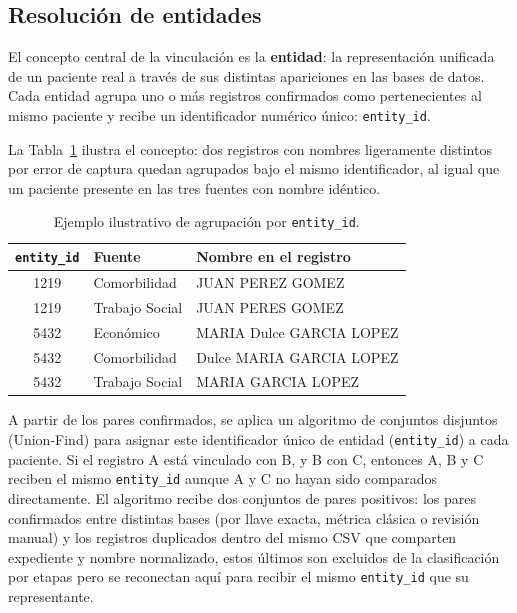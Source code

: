 \subsection{Resolución de entidades}

El concepto central de la vinculación es la \textbf{entidad}: la representación unificada de un paciente real a través de sus distintas apariciones en las bases de datos. Cada entidad agrupa uno o más registros confirmados como pertenecientes al mismo paciente y recibe un identificador numérico único: \texttt{entity\_id}.

La Tabla~\ref{tab:ejemplo_entidades} ilustra el concepto: dos registros con nombres ligeramente distintos por error de captura quedan agrupados bajo el mismo identificador, al igual que un paciente presente en las tres fuentes con nombre idéntico.

\begin{table}[H]
\centering
\caption{Ejemplo ilustrativo de agrupación por \texttt{entity\_id}.}
\label{tab:ejemplo_entidades}
\small
\begin{tabular}{clp{5.5cm}}
\toprule
\textbf{\texttt{entity\_id}} & \textbf{Fuente} & \textbf{Nombre en el registro} \\
\midrule
1219 & Comorbilidad   & JUAN PEREZ GOMEZ  \\
1219 & Trabajo Social & JUAN PERES GOMEZ  \\
\midrule
5432 & Económico      & MARIA Dulce GARCIA LOPEZ \\
5432 & Comorbilidad   & Dulce MARIA GARCIA LOPEZ \\
5432 & Trabajo Social & MARIA GARCIA LOPEZ \\
\bottomrule
\end{tabular}
\end{table}




A partir de los pares confirmados, se aplica un algoritmo de conjuntos disjuntos (Union-Find) para asignar este identificador único de entidad (\texttt{entity\_id}) a cada paciente. Si el registro A está vinculado con B, y B con C, entonces A, B y C reciben el mismo \texttt{entity\_id} aunque A y C no hayan sido comparados directamente.
El algoritmo recibe dos conjuntos de pares positivos: los pares confirmados entre distintas bases (por llave exacta, métrica clásica o revisión manual) y los registros duplicados dentro del mismo CSV que comparten expediente y nombre normalizado, estos últimos son excluidos de la clasificación por etapas pero se reconectan aquí para recibir el mismo \texttt{entity\_id} que su representante.

